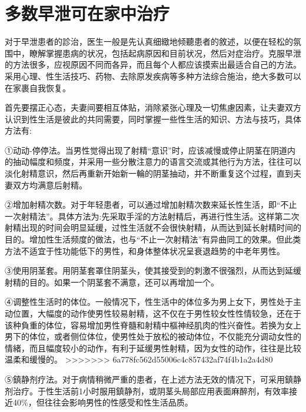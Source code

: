 \documentclass[12pt,UTF8]{ctexbook}
\begin{document}
\section{多数早泄可在家中治疗}

对于早泄患者的診治，医生一般是先认真细緻地倾聽患者的敘述，以便在轻松的氛围中，瞭解掌握患病的状况，包括起病原因和目前状况，然后对症治疗。克服早泄的方法很多，应视原因不同而各异，而且每个人都应该摸索出最适合自己的方法。采用心理、性生活技巧、药物、去除原发疾病等多种方法综合施治，绝大多数可以在家裹自我恢复。

首先要摆正心态，夫妻间要相互体贴，消除紧张心理及一切焦慮因素，让夫妻双方认识到性生活是彼此的共同需要，同时掌握一些性生活的知识、方法与技巧，具体方法有:

①动动-停停法。当男性觉得出现了射精“意识”时，应该减慢或停止阴茎在阴道内的抽动幅度和频度，并采用一些分散注意力的语言交流或其他行为方法，往往可以淡化射精意识，然后再重新开始新一輪的阴茎抽动，并不断重复这个过程，直到夫妻双方均满意后射精。

②增加射精次数。对于年轻患者，可以通过增加射精次数来延长性生活，即“不止一次射精法”。具体方法为:先采取手淫的方法射精后，再进行性生活。这样第二次射精出现的时间会明显延缓，过性生活就不会很快射精，从而达到延长射精时间的目的。增加性生活频度的做法，也与“不止一次射精法”有异曲同工的效果。但此类方法不适宜于性功能低下的男性，和身体整体状况呈衰退趋势的中老年男性。

③使用阴茎套。用阴茎套罩住阴茎头，使其接受到的刺激不很强烈，从而达到延缓射精的目的。如果一个阴茎套不满意，还可以再增加一个。

④调整性生活时的体位。一般情况下，性生活中的体位多为男上女下，男性处于主动位置，大幅度的动作使男性较易射精，这不仅在于男性较女性性情较急，还在于该种負重的体位，容易增加男性脊髓和射精中樞神经肌肉的性兴奋性。若换为女上男下的体位，或者侧位体位，使男性处于放松的被动体位，不仅能充分调动女性的情緒，而且幅度较小的动作，有利于延缓男性射精，因为女性的动作，往往是比较温柔和缓慢的。
>>>>>>> 6a778fc562d55006c4c857432af74f4b1a2a4d80

⑤鎮静剂疗法。对于病情稍微严重的患者，在上述方法无效的情况下，可采用鎮静剂治疗。于性生活前1小时服用鎮静剂，或阴茎头局部应用表面麻醉剂，有效率接近40\%，但往往会影响男性的性感受和性生活品质。
\end{document}
